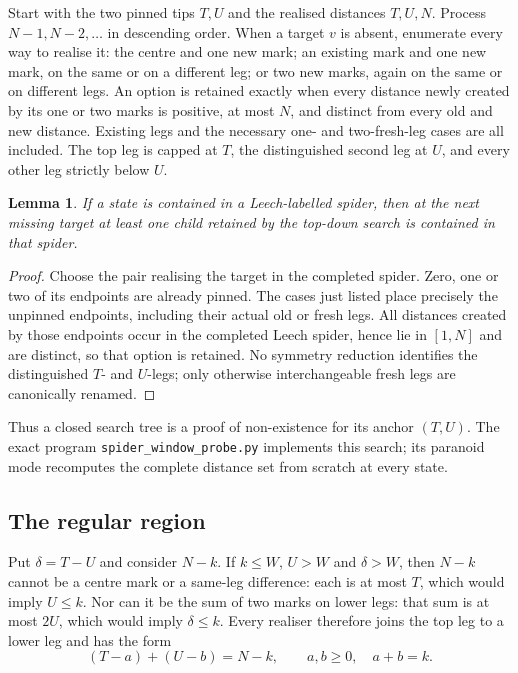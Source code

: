 \documentclass[11pt,a4paper]{article}
\theoremstyle{plain}
\newtheorem{lemma}[theorem]{Lemma}
\theoremstyle{remark}
\newcommand{\file}[1]{\texttt{#1}}
\begin{document}
Start with the two pinned tips $T,U$ and the realised distances $T,U,N$.
Process $N-1,N-2,\ldots$ in descending order.  When a target $v$ is absent,
enumerate every way to realise it: the centre and one new mark; an existing
mark and one new mark, on the same or on a different leg; or two new marks,
again on the same or on different legs.  An option is retained exactly when
every distance newly created by its one or two marks is positive, at most $N$,
and distinct from every old and new distance.  Existing legs and the necessary
one- and two-fresh-leg cases are all included.  The top leg is capped at $T$,
the distinguished second leg at $U$, and every other leg strictly below $U$.

\begin{lemma}\label{lem:spidercomplete}
If a state is contained in a Leech-labelled spider, then at the next missing
target at least one child retained by the top-down search is contained in that
spider.
\end{lemma}

\begin{proof}
Choose the pair realising the target in the completed spider.  Zero, one or two
of its endpoints are already pinned.  The cases just listed place precisely the
unpinned endpoints, including their actual old or fresh legs.  All distances
created by those endpoints occur in the completed Leech spider, hence lie in
$[1,N]$ and are distinct, so that option is retained.  No symmetry reduction
identifies the distinguished $T$- and $U$-legs; only otherwise interchangeable
fresh legs are canonically renamed.
\end{proof}

Thus a closed search tree is a proof of non-existence for its anchor $(T,U)$.
The exact program \file{spider\_window\_probe.py} implements this search; its
paranoid mode recomputes the complete distance set from scratch at every state.

\subsection{The regular region}

Put $\delta=T-U$ and consider $N-k$.  If $k\le W$, $U>W$ and
$\delta>W$, then $N-k$ cannot be a centre mark or a same-leg difference: each
is at most $T$, which would imply $U\le k$.  Nor can it be the sum of two
marks on lower legs: that sum is at most $2U$, which would imply
$\delta\le k$.  Every realiser therefore joins the top leg to a lower leg and
has the form
\begin{equation}\label{eq:spideroffsets}
   (T-a)+(U-b)=N-k,\qquad a,b\ge0,\quad a+b=k.
\end{equation}
\end{document}
